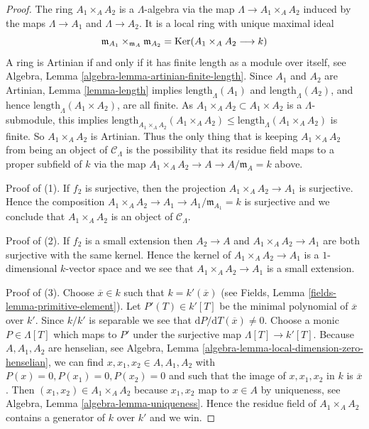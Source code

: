 \begin{proof}
The ring $A_1 \times_A A_2$ is a $\Lambda$-algebra via  the map
$\Lambda \to A_1 \times_A A_2$ induced by the maps
$\Lambda \to A_1$ and $\Lambda \to A_2$. It is a local ring with unique
maximal ideal
$$
\mathfrak m_{A_1} \times_{\mathfrak m_A} \mathfrak m_{A_2} =
\mathop{\mathrm{Ker}}(A_1 \times_A A_2 \longrightarrow k)
$$
A ring is Artinian if and only if it has finite length as a module
over itself, see
Algebra, Lemma \ref{algebra-lemma-artinian-finite-length}.
Since $A_1$ and $A_2$ are Artinian, Lemma \ref{lemma-length} implies
$\text{length}_\Lambda(A_1)$ and $\text{length}_\Lambda(A_2)$,
and hence $\text{length}_\Lambda(A_1 \times A_2)$, are all finite.  As
$A_1 \times_A A_2 \subset A_1 \times A_2$ is a $\Lambda$-submodule, this
implies
$\text{length}_{A_1 \times_A A_2}(A_1 \times_A A_2) \leq
\text{length}_\Lambda(A_1 \times_A A_2)$ is finite. So $A_1
\times_A A_2$ is Artinian. Thus the only thing that is keeping
$A_1 \times_A A_2$ from being an object of $\mathcal{C}_\Lambda$ is
the possibility that its residue field maps to a proper subfield of $k$
via the map $A_1 \times_A A_2 \to A \to A/\mathfrak m_A = k$ above.

\medskip\noindent
Proof of (1). If $f_2$ is surjective, then the projection
$A_1 \times_A A_2 \to A_1$ is surjective. Hence the composition
$A_1 \times_A A_2 \to A_1 \to A_1/\mathfrak m_{A_1} = k$ is surjective
and we conclude that $A_1 \times_A A_2$ is an object of $\mathcal{C}_\Lambda$.

\medskip\noindent
Proof of (2). If $f_2$ is a small extension then $A_2 \to A$ and
$A_1 \times_A A_2  \to A_1$ are both surjective with the same kernel.
Hence the kernel of $A_1 \times_A A_2  \to A_1$ is a $1$-dimensional
$k$-vector space and we see that $A_1 \times_A A_2  \to A_1$ is a small
extension.

\medskip\noindent
Proof of (3). Choose $\overline{x} \in k$ such that
$k = k'(\overline{x})$ (see
Fields, Lemma \ref{fields-lemma-primitive-element}).
Let $P'(T) \in k'[T]$ be the minimal polynomial of $\overline{x}$ over $k'$.
Since $k/k'$ is separable we see that
$\text{d}P/\text{d}T(\overline{x}) \not = 0$.
Choose a monic $P \in \Lambda[T]$ which maps to $P'$ under the surjective map
$\Lambda[T] \to k'[T]$. Because $A, A_1, A_2$ are henselian, see
Algebra, Lemma \ref{algebra-lemma-local-dimension-zero-henselian},
we can find $x, x_1, x_2 \in A, A_1, A_2$ with $P(x) = 0, P(x_1) = 0,
P(x_2) = 0$ and such that the image of $x, x_1, x_2$ in $k$ is $\overline{x}$.
Then $(x_1, x_2) \in A_1 \times_A A_2$ because $x_1, x_2$
map to $x \in A$ by uniqueness, see
Algebra, Lemma \ref{algebra-lemma-uniqueness}.
Hence the residue field of
$A_1 \times_A A_2$ contains a generator of $k$ over $k'$ and we win.
\end{proof}

